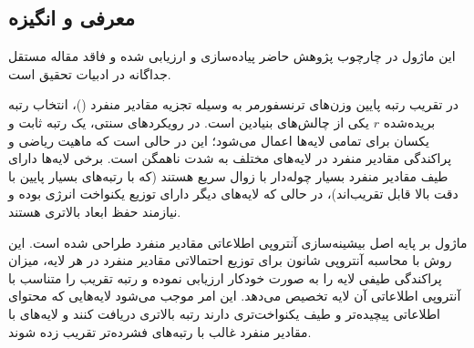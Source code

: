\subsection{معرفی و انگیزه}
این ماژول در چارچوب پژوهش حاضر پیاده‌سازی و ارزیابی شده و فاقد مقاله مستقل جداگانه در ادبیات تحقیق است.

در تقریب رتبه پایین وزن‌های ترنسفورمر به وسیله تجزیه مقادیر منفرد ()، انتخاب رتبه بریده‌شده $r$ یکی از چالش‌های بنیادین است. در رویکردهای سنتی، یک رتبه ثابت و یکسان برای تمامی لایه‌ها اعمال می‌شود؛ این در حالی است که ماهیت ریاضی و پراکندگی مقادیر منفرد در لایه‌های مختلف به شدت ناهمگن است. برخی لایه‌ها دارای طیف مقادیر منفرد بسیار چوله‌دار با زوال سریع هستند (که با رتبه‌های بسیار پایین با دقت بالا قابل تقریب‌اند)، در حالی که لایه‌های دیگر دارای توزیع یکنواخت انرژی بوده و نیازمند حفظ ابعاد بالاتری هستند.

ماژول  بر پایه اصل بیشینه‌سازی آنتروپی اطلاعاتی مقادیر منفرد طراحی شده است. این روش با محاسبه آنتروپی شانون برای توزیع احتمالاتی مقادیر منفرد در هر لایه، میزان پراکندگی طیفی لایه را به صورت خودکار ارزیابی نموده و رتبه تقریب را متناسب با آنتروپی اطلاعاتی آن لایه تخصیص می‌دهد. این امر موجب می‌شود لایه‌هایی که محتوای اطلاعاتی پیچیده‌تر و طیف یکنواخت‌تری دارند رتبه بالاتری دریافت کنند و لایه‌های با مقادیر منفرد غالب با رتبه‌های فشرده‌تر تقریب زده شوند.
